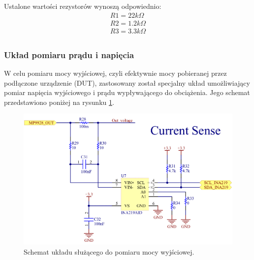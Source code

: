 Ustalone wartości rezystorów wynoszą odpowiednio:
\begin{equation}
    \label{eq:wartoscirezystorowprzetwornica}
    \begin{aligned}
        R1 = 22k \Omega \\
        R2 = 1.2k \Omega \\
        R3 = 3.3k \Omega \\
    \end{aligned}
\end{equation}




\subsubsection{Układ pomiaru prądu i napięcia}

W celu pomiaru mocy wyjściowej, czyli efektywnie mocy pobieranej przez podłączone urządzenie (DUT), zastosowany został specjalny układ umożliwiający 
pomiar napięcia wyjściowego i prądu wypływającego do obciążenia. Jego schemat przedstawiono poniżej na rysunku \ref{fig:pomiarpraduschemat}.

\begin{figure}[h!]
    \begin{center}
        \includegraphics[width = 17cm]{images/pomiarpraduina219_3.png}
        \caption{Schemat układu służącego do pomiaru mocy wyjściowej.}
        \label{fig:pomiarpraduschemat}
    \end{center}
\end{figure}

